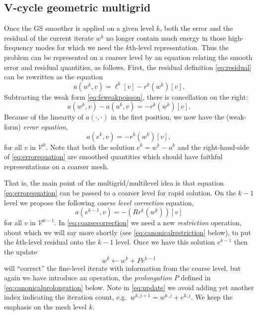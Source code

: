 \documentclass[letterpaper,final,12pt,reqno]{amsart}
\numberwithin{equation}{section}
\numberwithin{figure}{section}
\numberwithin{table}{section}
\begin{document}
\subsection*{V-cycle geometric multigrid}  Once the GS smoother is applied on a given level $k$, both the error and the residual of the current iterate $w^k$ no longer contain much energy in those high-frequency modes for which we need the $k$th-level representation.  Thus the problem can be represented on a coarser level by an equation relating the smooth error and residual quantities, as follows.  First, the residual definition \eqref{eq:residual} can be rewritten as the equation
\begin{equation}
  a(w^k,v) = \ell^k[v] - r^k(w^k)[v].  \label{eq:residualrewrite}
\end{equation}
Subtracting the weak form \eqref{eq:feweakpoisson}, there is cancellation on the right:
\begin{equation}
  a(w^k,v) - a(u^k,v) = - r^k(w^k)[v].  \label{eq:errorequationearly}
\end{equation}
Because of the linearity of $a(\cdot,\cdot)$ in the first position, we now have the (weak-form) \emph{error equation},
\begin{equation}
  a(e^k,v) = - r^k(w^k)[v],  \label{eq:errorequation}
\end{equation}
for all $v$ in $\mathcal{V}^k$.  Note that both the solution $e^k=w^k-u^k$ and the right-hand-side of \eqref{eq:errorequation} are smoothed quantities which should have faithful representations on a coarser mesh.

That is, the main point of the multigrid/multilevel idea is that equation \eqref{eq:errorequation} can be passed to a coarser level for rapid solution.  On the $k-1$ level we propose the following \emph{coarse level correction}  equation,
\begin{equation}
  a(e^{k-1},v) = - (Rr^k(w^k))[v]  \label{eq:coarsecorrection}
\end{equation}
for all $v$ in $\mathcal{V}^{k-1}$.  In \eqref{eq:coarsecorrection} we need a new \emph{restriction} operation, about which we will say more shortly (see \eqref{eq:canonicalrestriction} below), to put the $k$th-level residual onto the $k-1$ level.  Once we have this solution $e^{k-1}$ then the update
\begin{equation}
  w^k \gets w^k + P e^{k-1}  \label{eq:update}
\end{equation}
will ``correct'' the fine-level iterate with information from the coarse level, but again we have introduce an operation, the \emph{prolongation} $P$ defined in \eqref{eq:canonicalprolongation} below.  Note in \eqref{eq:update} we avoid adding yet another index indicating the iteration count, e.g.~$w^{k,j+1} = w^{k,j} + e^{k,j}$.  We keep the emphasis on the mesh level $k$.
\end{document}
